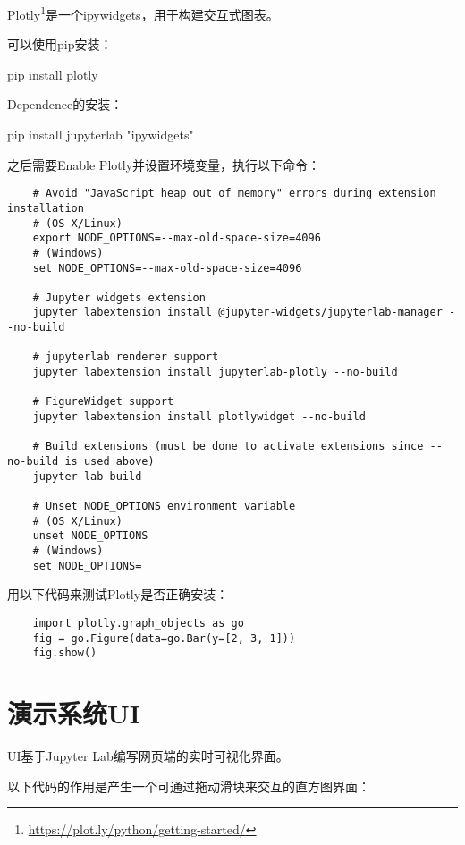 Plotly\footnote{\url{https://plot.ly/python/getting-started/}}是一个ipywidgets，用于构建交互式图表。

可以使用pip安装：

\begin{tcolorbox}
    pip install plotly
\end{tcolorbox}

Dependence的安装：

\begin{tcolorbox}
    pip install jupyterlab "ipywidgets"
\end{tcolorbox}

之后需要Enable Plotly并设置环境变量，执行以下命令：

\begin{verbatim}
    # Avoid "JavaScript heap out of memory" errors during extension installation
    # (OS X/Linux)
    export NODE_OPTIONS=--max-old-space-size=4096
    # (Windows)
    set NODE_OPTIONS=--max-old-space-size=4096

    # Jupyter widgets extension
    jupyter labextension install @jupyter-widgets/jupyterlab-manager --no-build

    # jupyterlab renderer support
    jupyter labextension install jupyterlab-plotly --no-build

    # FigureWidget support
    jupyter labextension install plotlywidget --no-build

    # Build extensions (must be done to activate extensions since --no-build is used above)
    jupyter lab build

    # Unset NODE_OPTIONS environment variable
    # (OS X/Linux)
    unset NODE_OPTIONS
    # (Windows)
    set NODE_OPTIONS=
\end{verbatim}

用以下代码来测试Plotly是否正确安装：

\begin{verbatim}
    import plotly.graph_objects as go
    fig = go.Figure(data=go.Bar(y=[2, 3, 1]))
    fig.show()
\end{verbatim}

\section{演示系统UI}

UI基于Jupyter Lab编写网页端的实时可视化界面。

以下代码的作用是产生一个可通过拖动滑块来交互的直方图界面：

